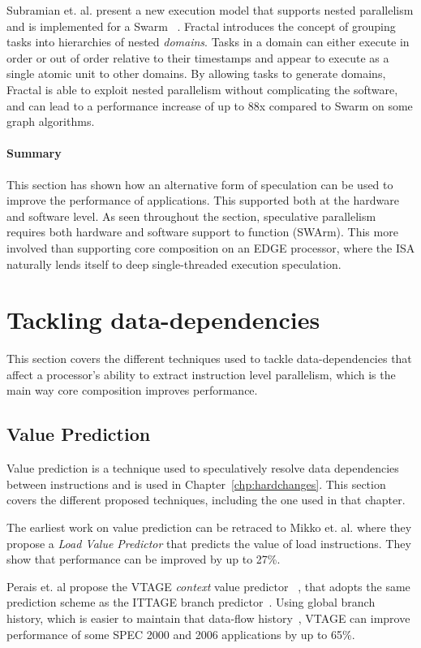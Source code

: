 Subramian et. al. present a new execution model that supports nested parallelism and is implemented for a Swarm~\cite{fractal2017} .
Fractal introduces the concept of grouping tasks into hierarchies of nested \textit{domains}.
Tasks in a domain can either execute in order or out of order relative to their timestamps and appear to execute as a single atomic unit to other domains.
By allowing tasks to generate domains, Fractal is able to exploit nested parallelism without complicating the software, and can lead to a performance increase of up to 88x compared to Swarm on some graph algorithms.
\vspace{-1em}
\paragraph*{Summary}
This section has shown how an alternative form of speculation can be used to improve the performance of applications.
This supported both at the hardware and software level.
As seen throughout the section, speculative parallelism requires both hardware and software support to function (SWArm).
This more involved than supporting core composition on an EDGE processor, where the ISA naturally lends itself to deep single-threaded execution speculation.
\vspace{-1em}
\section{Tackling data-dependencies}
This section covers the different techniques used to tackle data-dependencies that affect a processor's ability to extract instruction level parallelism, which is the main way core composition improves performance.
\subsection{Value Prediction}
Value prediction is a technique used to speculatively resolve data dependencies between instructions and is used in Chapter~\ref{chp:hardchanges}.
This section covers the different proposed techniques, including the one used in that chapter. 

The earliest work on value prediction can be retraced to Mikko et. al. where they propose a \textit{Load Value Predictor} \cite{lipasti96valpred} that predicts the value of load instructions.
They show that performance can be improved by up to 27\%.

Perais et. al propose the VTAGE \textit{context} value predictor ~\cite{peraisVTAGE2014}, that adopts the same prediction scheme as the ITTAGE branch predictor~\cite{SeznecITTAGE}.
Using global branch history, which is easier to maintain that data-flow history~\cite{peraisVTAGE2014}, VTAGE can improve performance of some SPEC 2000 and 2006 applications by up to 65\%.

